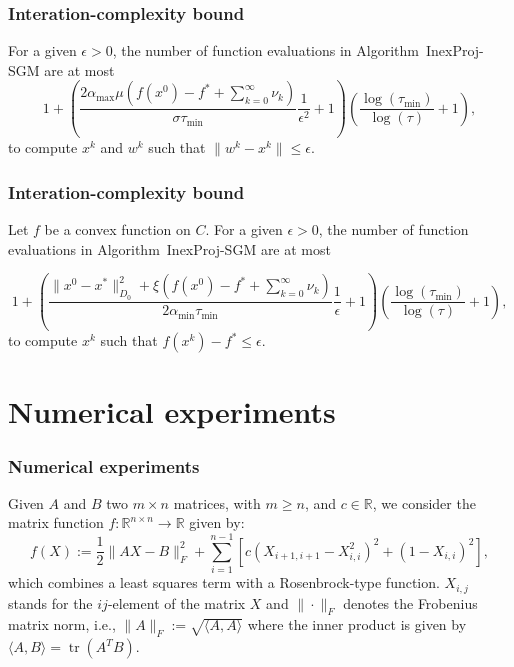 \documentclass[xcolor=dvipsnames,aspectratio=169,13pt]{beamer} %
\DeclareMathOperator{\tr}{tr}
\begin{document}
\begin{frame}[c]\frametitle{Interation-complexity bound}
\begin{theorem}
  For a given $\epsilon>0$, the number  of  function evaluations in  Algorithm~InexProj-SGM are  at most
    $$
      1+\left({\frac{2{\alpha_{\max}}\mu\left(f(x^0)-f^* +\sum_{k= 0}^{\infty}\nu_k\right) }{\sigma \tau_{\min}}} \frac{1}{\epsilon^2}+1\right) \left(\frac{\log (\tau_{\min})}{\log (\tau)}+1\right),
    $$
  to compute $x^k$ and $w^k$ such that $\|  w^{k}-x^{k}\|\leq \epsilon$.
\end{theorem}
\end{frame}


\begin{frame}[c]\frametitle{Interation-complexity bound}
\begin{theorem}
  Let $f$ be a convex function on $C$. For a given $\epsilon>0$, the number  of  function evaluations in  Algorithm~InexProj-SGM are  at most

  $$
    1+\left(\frac{\|x^0 - x^*\|^2_{D_0} + \xi\left(f(x^0)-f^*+ \sum_{k=0}^{\infty} \nu_k\right)}{2 \alpha_{\min} \tau_{\min}}\frac{1}{\epsilon}+1\right) \left(\frac{\log (\tau_{\min})}{\log (\tau)}+1\right),
  $$
  to compute $x^k$ such that $f(x^k) - f^*\leq \epsilon$.
\end{theorem}
\end{frame}

\section{Numerical experiments}

\begin{frame}[t]\frametitle{Numerical experiments}
  Given $A$ and $B$ two $m\times n$ matrices, with $m\geq n$, and $c\in\mathbb{R}$, we consider the matrix function $f:\mathbb{R}^{n\times n}\to\mathbb{R}$ given by:
$$f(X):=\dfrac{1}{2}\|AX-B\|^2_F + \sum_{i=1}^{n-1} \left[ c \left( X_{i+1,i+1}-X_{i,i}^2 \right)^2 + (1-X_{i,i})^2   \right],$$
which combines a least squares term with a Rosenbrock-type function. $X_{i,j}$ stands for the $ij$-element of the matrix $X$ and $\|\cdot\|_F$ denotes the Frobenius matrix norm, i.e., $\|A\|_F:=\sqrt{\langle A,A \rangle}$ where the inner product is given by $\langle A,B \rangle = \tr(A^TB)$. 
\end{frame}
\end{document}
